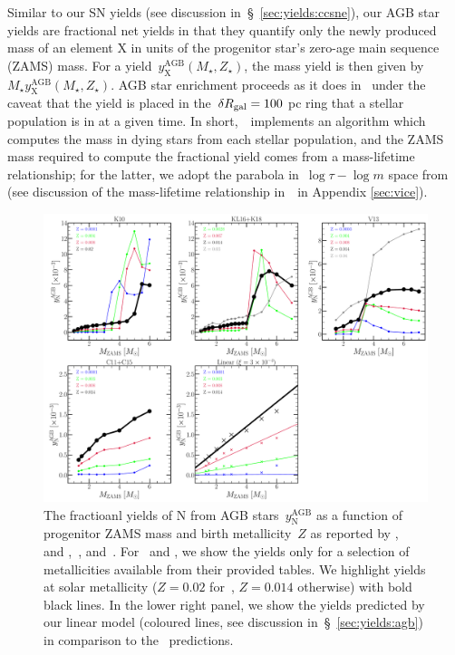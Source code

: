 \documentclass[ms.tex]{subfiles}
\begin{document}
Similar to our SN yields (see discussion in~\S~\ref{sec:yields:ccsne}), our
AGB star yields are fractional net yields in that they quantify only the newly
produced mass of an element X in units of the progenitor star's zero-age main
sequence (ZAMS) mass.
For a yield~$y_\text{X}^\text{AGB}(M_\star, Z_\star)$, the mass yield is then
given by~$M_\star y_\text{X}^\text{AGB}(M_\star, Z_\star)$.
AGB star enrichment proceeds as it does in~\citet{Johnson2020} under the caveat
that the yield is placed in the~$\delta R_\text{gal} = 100$ pc ring that a stellar
population is in at a given time.
In short,~\vice~implements an algorithm which computes the mass in dying stars
from each stellar population, and the ZAMS mass required to compute the
fractional yield comes from a mass-lifetime relationship; for the latter, we
adopt the parabola in~$\log\tau - \log m$ space from~\citet{Larson1974} (see
discussion of the mass-lifetime relationship in~\vice~in Appendix
\ref{sec:vice}).

\begin{figure}
\centering
\includegraphics[scale = 0.32]{agb_yield_models.pdf}
\caption{
The fractioanl yields of N from AGB stars~$y_\text{N}^\text{AGB}$ as a function
of progenitor ZAMS mass and birth metallicity~$Z$ as reported by
\citet[][upper left]{Karakas2010},~\citet{Karakas2016} and
\citet[][upper middle]{Karakas2018},~\citet[][upper right]{Ventura2013,
Ventura2014, Ventura2018, Ventura2020}, and~\citet[][lower right]{Cristallo2011,
Cristallo2015}.
For~\citet{Ventura2013, Ventura2014, Ventura2018, Ventura2020} and
\citet{Cristallo2011, Cristallo2015}, we show the yields only for a selection
of metallicities available from their provided tables.
We highlight yields at solar metallicity ($Z = 0.02$ for~\citealp{Karakas2010},
$Z = 0.014$ otherwise) with bold black lines.
In the lower right panel, we show the yields predicted by our linear model
(coloured lines, see discussion in~\S~\ref{sec:yields:agb}) in comparison to
the~\citet[][coloured X's]{Cristallo2011, Cristallo2015} predictions.
}
\label{fig:agb_yield_models}
\end{figure}
\end{document}
